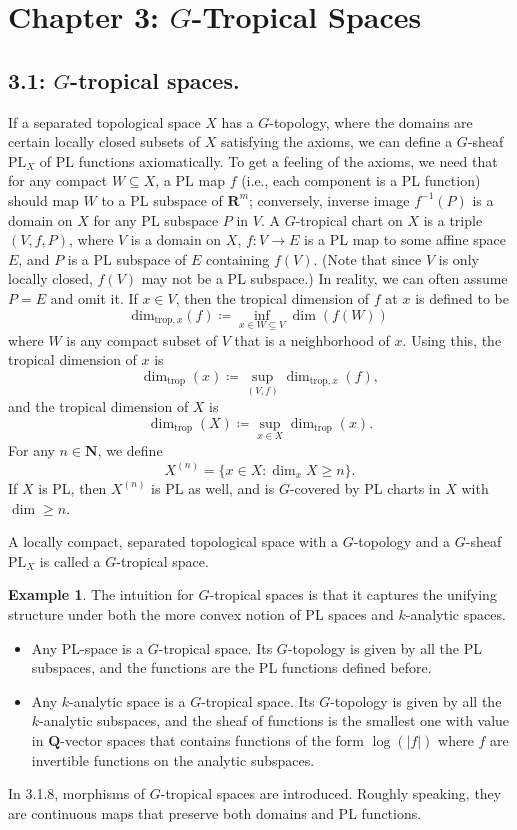\documentclass[12pt,reqno]{amsart}
\theoremstyle{definition}
\newtheorem{example}[theorem]{Example}
\theoremstyle{remark}
\theoremstyle{citedrem}
\theoremstyle{cited}
\theoremstyle{citeddef}
\theoremstyle{step}
\begin{document}
\section*{Chapter 3: $G$-Tropical Spaces}

\subsection*{3.1: $G$-tropical spaces.} If a separated topological space $X$ has a $G$-topology, where the domains are certain locally closed subsets of $X$ satisfying the axioms, we can define a $G$-sheaf $\mathrm{PL}_X$ of PL functions axiomatically. To get a feeling of the axioms, we need that for any compact $W \subseteq X$, a PL map $f$ (i.e., each component is a PL function) should map $W$ to a PL subspace of $\mathbf{R}^m$; conversely, inverse image $f^{-1}(P)$ is a domain on $X$ for any PL subspace $P$ in $V$. A $G$-tropical chart on $X$ is a triple $(V, f, P)$, where $V$ is a domain on $X$, $f\colon V \to E$ is a PL map to some affine space $E$, and $P$ is a PL subspace of $E$ containing $f(V)$. (Note that since $V$ is only locally closed, $f(V)$ may not be a PL subspace.) In reality, we can often assume $P = E$ and omit it. If $x \in V$, then the tropical dimension of $f$ at $x$ is defined to be \[\mathrm{dim}_{\mathrm{trop},x}(f)\coloneqq \inf_{x \in W \subseteq V} \dim (f(W))\] where $W$ is any compact subset of $V$ that is a neighborhood of $x$. Using this, the tropical dimension of $x$ is \[\dim_{\mathrm{trop}}(x) \coloneqq \sup_{(V,f)} \dim_{\mathrm{trop},x}(f),\] and the tropical dimension of $X$ is \[\dim_{\mathrm{trop}}(X) \coloneqq \sup_{x \in X} \dim_{\mathrm{trop}}(x).\] For any $n \in \mathbf{N}$, we define \[X^{(n)} = \{x \in X \colon \dim_x X \geq n\}.\] If $X$ is PL, then $X^{(n)}$ is PL as well, and is $G$-covered by PL charts in $X$ with $\dim \geq n$.

A locally compact, separated topological space with a $G$-topology and a $G$-sheaf $\mathrm{PL}_X$ is called a $G$-tropical space.

\begin{example}
The intuition for $G$-tropical spaces is that it captures the unifying structure under both the more convex notion of PL spaces and $k$-analytic spaces. 
    \begin{itemize}
        \item Any PL-space is a $G$-tropical space. Its $G$-topology is given by all the PL subspaces, and the functions are the PL functions defined before. 
        \item Any $k$-analytic space is a $G$-tropical space. Its $G$-topology is given by all the $k$-analytic subspaces, and the sheaf of functions is the smallest one with value in $\mathbf{Q}$-vector spaces that contains functions of the form $\log(|f|)$ where $f$ are invertible functions on the analytic subspaces. 
    \end{itemize}
\end{example}
In 3.1.8, morphisms of $G$-tropical spaces are introduced. Roughly speaking, they are continuous maps that preserve both domains and PL functions. 
\end{document}
